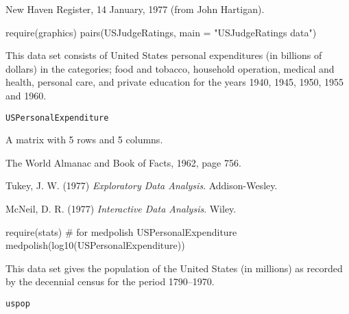 %
\begin{Source}\relax
New Haven Register, 14 January, 1977 (from John Hartigan).
\end{Source}
%
\begin{Examples}
\begin{ExampleCode}
require(graphics)
pairs(USJudgeRatings, main = "USJudgeRatings data")
\end{ExampleCode}
\end{Examples}
%
\begin{Description}\relax
This data set consists of United States personal expenditures (in
billions of dollars) in the categories; food and tobacco, household
operation, medical and health, personal care, and private education
for the years 1940, 1945, 1950, 1955 and 1960.
\end{Description}
%
\begin{Usage}
\begin{verbatim}
USPersonalExpenditure
\end{verbatim}
\end{Usage}
%
\begin{Format}
A matrix with 5 rows and 5 columns.
\end{Format}
%
\begin{Source}\relax
The World Almanac and Book of Facts, 1962, page 756.
\end{Source}
%
\begin{References}\relax
Tukey, J. W. (1977)
\emph{Exploratory Data Analysis}.
Addison-Wesley.

McNeil, D. R. (1977)
\emph{Interactive Data Analysis}.
Wiley.
\end{References}
%
\begin{Examples}
\begin{ExampleCode}
require(stats) # for medpolish
USPersonalExpenditure
medpolish(log10(USPersonalExpenditure))
\end{ExampleCode}
\end{Examples}
%
\begin{Description}\relax
This data set gives the population of the United States (in millions)
as recorded by the decennial census for the period 1790--1970.
\end{Description}
%
\begin{Usage}
\begin{verbatim}
uspop
\end{verbatim}
\end{Usage}
